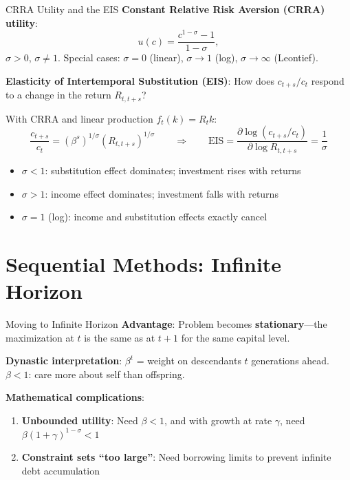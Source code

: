 \documentclass[blue]{beamer}
\begin{document}
\begin{frame}{CRRA Utility and the EIS}
	\textbf{Constant Relative Risk Aversion (CRRA) utility}: 
	$$
	u(c) = \frac{c^{1-\sigma} - 1}{1-\sigma},
	$$
	$\sigma > 0$, $\sigma \neq 1$. Special cases: $\sigma = 0$ (linear), $\sigma \to 1$ (log), $\sigma \to \infty$ (Leontief).
	
	\textbf{Elasticity of Intertemporal Substitution (EIS)}: How does $c_{t+s}/c_t$ respond to a change in the return $R_{t,t+s}$?
	
	With CRRA and linear production $f_t(k) = R_t k$:
	\[
	\frac{c_{t+s}}{c_t} = (\beta^s)^{1/\sigma}(R_{t,t+s})^{1/\sigma} \qquad \Rightarrow \qquad \text{EIS} = \frac{\partial \log(c_{t+s}/c_t)}{\partial \log R_{t,t+s}} = \frac{1}{\sigma}
	\]
	\vspace{-20pt}
	\begin{itemize}
		\item $\sigma < 1$: substitution effect dominates; investment rises with returns
		\item $\sigma > 1$: income effect dominates; investment falls with returns
		\item $\sigma = 1$ (log): income and substitution effects exactly cancel
	\end{itemize}
\end{frame}

\section{Sequential Methods: Infinite Horizon}

\begin{frame}{Moving to Infinite Horizon}
	\textbf{Advantage}: Problem becomes \textbf{stationary}---the maximization at $t$ is the same as at $t+1$ for the same capital level.
	
	\bigskip
	\textbf{Dynastic interpretation}: $\beta^t$ = weight on descendants $t$ generations ahead. $\beta < 1$: care more about self than offspring.
	
	\bigskip
	\textbf{Mathematical complications}:
	\begin{enumerate}
		\item \textbf{Unbounded utility}: Need $\beta < 1$, and with growth at rate $\gamma$, need $\beta(1+\gamma)^{1-\sigma} < 1$
		\item \textbf{Constraint sets ``too large''}: Need borrowing limits to prevent infinite debt accumulation
	\end{enumerate}
\end{frame}
\end{document}
